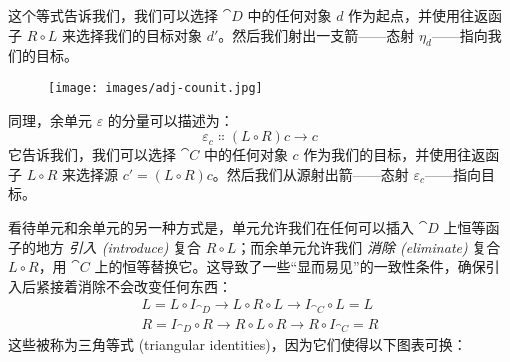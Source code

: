 这个等式告诉我们，我们可以选择 $\cat{D}$ 中的任何对象 $d$ 作为起点，并使用往返函子 $R \circ L$ 来选择我们的目标对象 $d'$。然后我们射出一支箭——态射 $\eta_d$——指向我们的目标。

\begin{figure}[H]
  \centering
  \texttt{[image: images/adj-counit.jpg]}
\end{figure}

\noindent
同理，余单元 $\varepsilon$ 的分量可以描述为：
\[\varepsilon_{c} \Colon (L \circ R) c \to c\]
它告诉我们，我们可以选择 $\cat{C}$ 中的任何对象 $c$ 作为我们的目标，并使用往返函子 $L \circ R$ 来选择源 $c' = (L \circ R) c$。然后我们从源射出箭——态射 $\varepsilon_{c}$——指向目标。

看待单元和余单元的另一种方式是，单元允许我们在任何可以插入 $\cat{D}$ 上恒等函子的地方 \emph{引入 (introduce)} 复合 $R \circ L$；而余单元允许我们 \emph{消除 (eliminate)} 复合 $L \circ R$，用 $\cat{C}$ 上的恒等替换它。这导致了一些“显而易见”的一致性条件，确保引入后紧接着消除不会改变任何东西：
\begin{gather*}
  L = L \circ I_{\cat{D}} \to L \circ R \circ L \to I_{\cat{C}} \circ L = L \\
  R = I_{\cat{D}} \circ R \to R \circ L \circ R \to R \circ I_{\cat{C}} = R
\end{gather*}
这些被称为三角等式 (triangular identities)，因为它们使得以下图表可换：

\begin{figure}[H]
  \centering

  \begin{subfigure}
    \centering
  \end{subfigure}%
  \hspace{1cm}
  \begin{subfigure}
    \centering
  \end{subfigure}
\end{figure}

